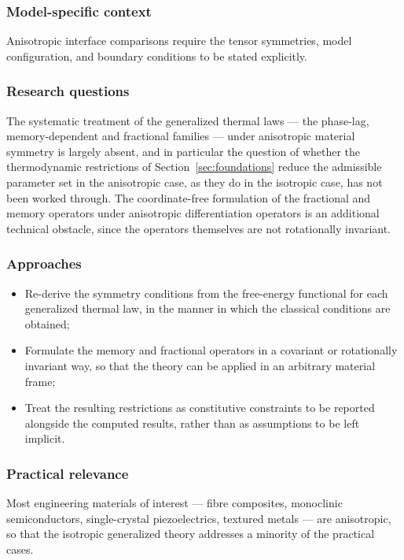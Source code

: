 \subsubsection{Model-specific context}

Anisotropic interface comparisons require the tensor symmetries, model configuration, and boundary conditions to be stated explicitly.

\subsubsection{Research questions}

The systematic treatment of the generalized thermal laws --- the phase-lag, memory-dependent and fractional families --- under anisotropic material symmetry is largely absent, and in particular the question of whether the thermodynamic restrictions of Section~\ref{sec:foundations} reduce the admissible parameter set in the anisotropic case, as they do in the isotropic case, has not been worked through. The coordinate-free formulation of the fractional and memory operators under anisotropic differentiation operators is an additional technical obstacle, since the operators themselves are not rotationally invariant.

\subsubsection{Approaches}

\begin{itemize}
\item Re-derive the symmetry conditions from the free-energy functional for each generalized thermal law, in the manner in which the classical conditions are obtained;
\item Formulate the memory and fractional operators in a covariant or rotationally invariant way, so that the theory can be applied in an arbitrary material frame;
\item Treat the resulting restrictions as constitutive constraints to be reported alongside the computed results, rather than as assumptions to be left implicit.
\end{itemize}

\subsubsection{Practical relevance}

Most engineering materials of interest --- fibre composites, monoclinic semiconductors, single-crystal piezoelectrics, textured metals --- are anisotropic, so that the isotropic generalized theory addresses a minority of the practical cases.

